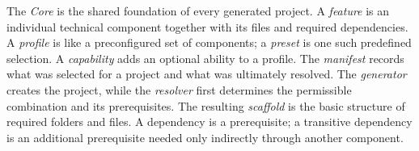 \begin{beginnerstatement}

The \emph{Core} is the shared foundation of every generated project. A
\emph{feature} is an individual technical component together with its files
and required dependencies. A \emph{profile} is like a preconfigured set of
components; a \emph{preset} is one such predefined selection. A
\emph{capability} adds an optional ability to a profile. The \emph{manifest}
records what was selected for a project and what was ultimately resolved. The
\emph{generator} creates the project, while the \emph{resolver} first
determines the permissible combination and its prerequisites. The resulting
\emph{scaffold} is the basic structure of required folders and files. A
dependency is a prerequisite; a transitive dependency is an additional
prerequisite needed only indirectly through another component.

\end{beginnerstatement}
